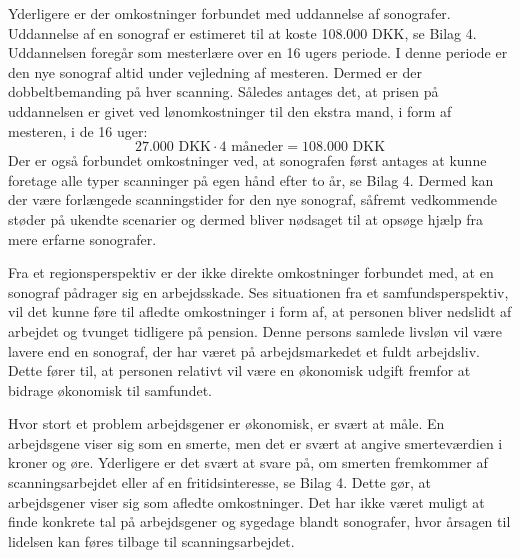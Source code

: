 Yderligere er der omkostninger forbundet med uddannelse af sonografer. Uddannelse af en sonograf er estimeret til at koste 108.000 DKK, se Bilag 4. Uddannelsen foregår som mesterlære over en 16 ugers periode. I denne periode er den nye sonograf altid under vejledning af mesteren. Dermed er der dobbeltbemanding på hver scanning. Således antages det, at prisen på uddannelsen er givet ved lønomkostninger til den ekstra mand, i form af mesteren, i de 16 uger:
\begin{equation}
27.000 \text{ DKK}\cdot4 \text{ måneder} = 108.000 \text{ DKK}
\end{equation}
Der er også forbundet omkostninger ved, at sonografen først antages at kunne foretage alle typer scanninger på egen hånd efter to år, se Bilag 4. Dermed kan der være forlængede scanningstider for den nye sonograf, såfremt vedkommende støder på ukendte scenarier og dermed bliver nødsaget til at opsøge hjælp fra mere erfarne sonografer.

Fra et regionsperspektiv er der ikke direkte omkostninger forbundet med, at en sonograf pådrager sig en arbejdsskade. Ses situationen fra et samfundsperspektiv, vil det kunne føre til afledte omkostninger i form af, at personen bliver nedslidt af arbejdet og tvunget tidligere på pension. Denne persons samlede livsløn vil være lavere end en sonograf, der har været på arbejdsmarkedet et fuldt arbejdsliv. Dette fører til, at personen relativt vil være en økonomisk udgift fremfor at bidrage økonomisk til samfundet. 

Hvor stort et problem arbejdsgener er økonomisk, er svært at måle. En arbejdsgene viser sig som en smerte, men det er svært at angive smerteværdien i kroner og øre. Yderligere er det svært
at svare på, om smerten fremkommer af scanningsarbejdet eller af en fritidsinteresse, se Bilag 4. Dette gør, at arbejdsgener viser sig som afledte omkostninger. Det har ikke været muligt at finde konkrete tal på arbejdsgener og sygedage blandt sonografer, hvor årsagen til lidelsen kan føres tilbage til scanningsarbejdet.  

